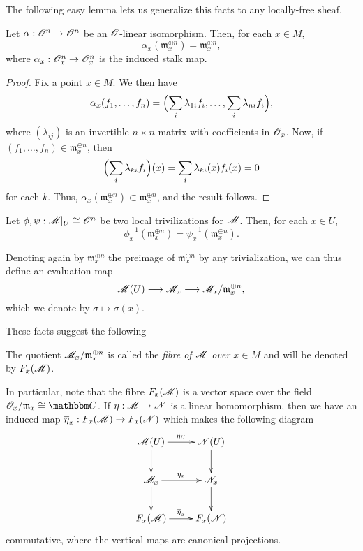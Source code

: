 The following easy lemma lets us generalize this facts to any locally-free sheaf.

\begin{lemma}
Let $\alpha :\mathscr{O}^n\to \mathscr{O}^n$ be an $\mathscr{O}$-linear isomorphism. Then, for each $x\in M$,
$$\alpha_x (\mathfrak{m}^{\oplus n}_x)=\mathfrak{m}^{\oplus n}_x,$$
where $\alpha_x:\mathscr{O}^n_x\to \mathscr{O}^n_x$ is the induced stalk map.
\end{lemma}
\begin{proof}
Fix a point $x\in M$. We then have
$$\alpha_x (f_1,\dots ,f_n)=\Bigl (\sum_i\lambda_{1i}f_i,\dots ,\sum_i\lambda_{ni}f_i\Bigr ),$$
where $(\lambda_{ij})$ is an invertible $n\times n$-matrix with coefficients in $\mathscr{O}_x$. Now, if $(f_1,\dots ,f_n)\in \mathfrak{m}^{\oplus n}_x$, then
$$\Bigl (\sum_i\lambda_{ki}f_i\Bigr )(x)=\sum_i\lambda_{ki}(x)f_i(x)=0$$
for each $k$. Thus, $\alpha_x(\mathfrak{m}^{\oplus n}_x)\subset \mathfrak{m}^{\oplus n}_x$, and the result follows.
\end{proof}

\begin{cor}
Let $\phi ,\psi:\mathscr{M}|_U\cong \mathscr{O}^n$ be two local trivilizations for $\mathscr{M}$. Then, for each $x\in U$,
$$\phi_x^{-1}(\mathfrak{m}^{\oplus n}_x)=\psi_x^{-1}(\mathfrak{m}^{\oplus n}_x).$$
\end{cor}

Denoting again by $\mathfrak{m}^{\oplus n}_x$ the preimage of $\mathfrak{m}^{\oplus n}_x$ by any trivialization, we can thus define an evaluation map
$$\mathscr{M}(U)\longrightarrow \mathscr{M}_x\longrightarrow \mathscr{M}_x/\mathfrak{m}_x^{\oplus n},$$
which we denote by $\sigma \mapsto \sigma (x)$.

These facts suggest the following
\begin{defi}
The quotient $\mathscr{M}_x/\mathfrak{m}_x^{\oplus n}$ is called the \emph{fibre of $\mathscr{M}$ over $x\in M$} and will be denoted by $F_x(\mathscr{M})$.
\end{defi}

In particular, note that the fibre $F_x(\mathscr{M})$ is a vector space over the field $\scr{O}_x/\mathfrak{m}_x\cong \comp$. If $\eta :\mathscr{M}\to \mathscr{N}$ is a linear homomorphism, then we have an induced map $\overline{\eta}_x:F_x(\mathscr{M})\to F_x(\mathscr{N})$ which makes the following diagram
$$
\xymatrix{\scr{M}(U) \ar[r]^{\eta_U} \ar[d] & \scr{N}(U) \ar[d] \\
\scr{M}_x \ar[r]^{\eta_x} \ar[d] & \scr{N}_x \ar[d] \\
F_x(\scr{M}) \ar[r]^{\overline{\eta}_x} & F_x(\scr{N})}
$$
commutative, where the vertical maps are canonical projections.

